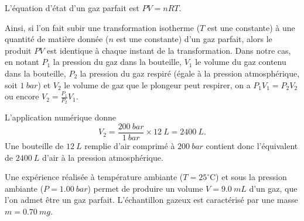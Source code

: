 \begin{corrige}
L'équation d'état d'un gaz parfait est $PV=nRT$. 

Ainsi, si l'on fait subir une transformation isotherme ($T$ est une constante) à une quantité de matière donnée ($n$ est une constante) d'un gaz parfait, alors le produit $PV$ est identique à chaque instant de la transformation. Dans notre cas, en notant $P_1$ la pression du gaz dans la bouteille, $V_1$ le volume du gaz contenu dans la bouteille, $P_2$ la pression du gaz respiré (égale à la pression atmosphérique, soit $\SI{1}{bar}$) et $V_2$ le volume de gaz que le plongeur peut respirer, on a $P_1V_1=P_2V_2$ ou encore $V_2=\frac{P_1}{P_2}V_1$. 

L'application numérique donne 
\[
V_2=\frac{\SI{200}{bar}}{\SI{1}{bar}}\times \SI{12}{L} =\SI{2400}{L}.
\]
 Une bouteille de $\SI{12}{L}$ remplie d'air comprimé à $\SI{200}{bar}$ contient donc l'équivalent de $\SI{2400}{L}$ d'air à la pression atmosphérique.
\end{corrige}


\finEntrainement






\hauteurLargeurCadreReponse		{8mm}{3.5cm}
\initialisationEntrainement

Une expérience réalisée à température ambiante ($T=25^\circ$C) et sous la pression ambiante ($P=\SI{1,00}{bar}$) permet de produire un volume $V=\SI{9,0}{mL}$ d'un gaz, que l'on admet être un gaz parfait. L'échantillon gazeux est caractérisé par une masse $m=\SI{0,70}{mg}$.

\debutEntrainement


